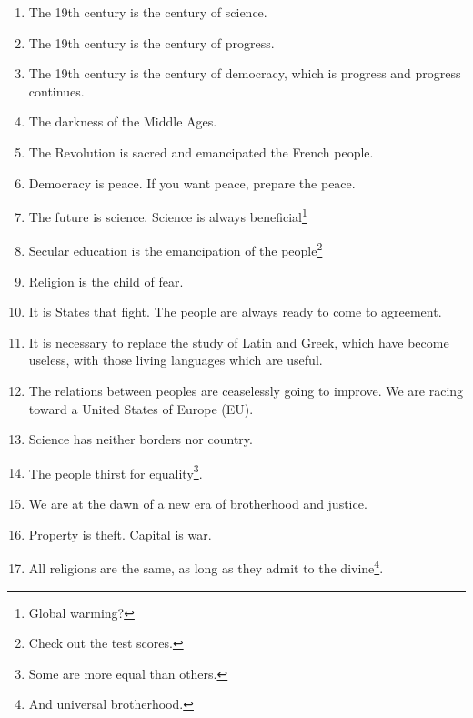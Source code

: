 \begin{enumerate}


\item The 19th century is the century of science.

\item The 19th century is the century of progress.

\item The 19th century is the century of democracy, which is progress and progress continues.

\item The darkness of the Middle Ages.

\item The Revolution is sacred and emancipated the French people.

\item Democracy is peace. If you want peace, prepare the peace.

\item The future is science. Science is always beneficial\footnote{Global warming?} 

\item Secular education is the emancipation of the people\footnote{Check out the test scores.} 

\item Religion is the child of fear.

\item It is States that fight. The people are always ready to come to agreement.

\item It is necessary to replace the study of Latin and Greek, which have become useless, with those living languages which are useful.

\item The relations between peoples are ceaselessly going to improve. We are racing toward a United States of Europe (EU).

\item Science has neither borders nor country.

\item The people thirst for equality\footnote{Some are more equal than others.}.

\item We are at the dawn of a new era of brotherhood and justice.

\item Property is theft. Capital is war.

\item All religions are the same, as long as they admit to the divine\footnote{And universal brotherhood.}.


\end{enumerate}
